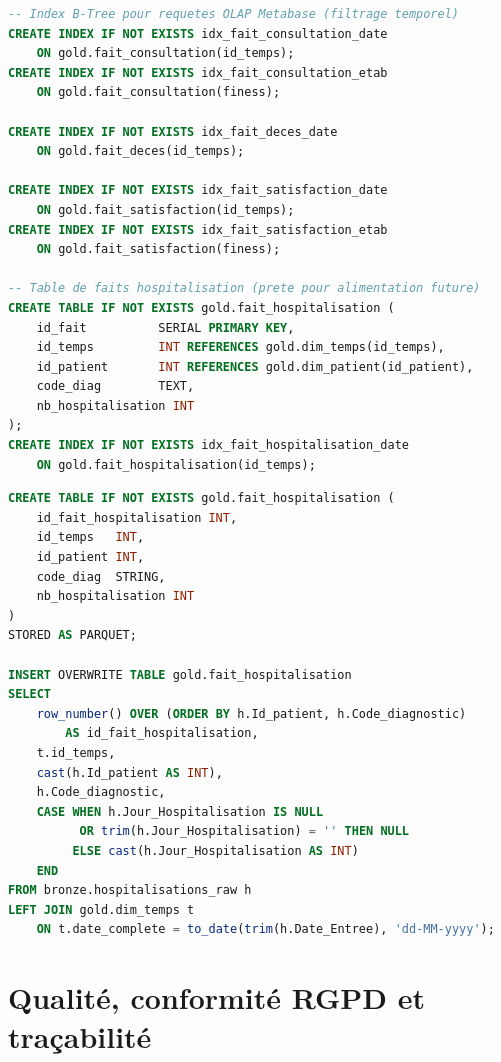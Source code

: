 \documentclass[12pt,a4paper]{report}
\begin{document}
\begin{lstlisting}[language=SQL, caption=003\_create\_gold\_core.sql -- index B-Tree sur les tables de faits]
-- Index B-Tree pour requetes OLAP Metabase (filtrage temporel)
CREATE INDEX IF NOT EXISTS idx_fait_consultation_date
    ON gold.fait_consultation(id_temps);
CREATE INDEX IF NOT EXISTS idx_fait_consultation_etab
    ON gold.fait_consultation(finess);

CREATE INDEX IF NOT EXISTS idx_fait_deces_date
    ON gold.fait_deces(id_temps);

CREATE INDEX IF NOT EXISTS idx_fait_satisfaction_date
    ON gold.fait_satisfaction(id_temps);
CREATE INDEX IF NOT EXISTS idx_fait_satisfaction_etab
    ON gold.fait_satisfaction(finess);

-- Table de faits hospitalisation (prete pour alimentation future)
CREATE TABLE IF NOT EXISTS gold.fait_hospitalisation (
    id_fait          SERIAL PRIMARY KEY,
    id_temps         INT REFERENCES gold.dim_temps(id_temps),
    id_patient       INT REFERENCES gold.dim_patient(id_patient),
    code_diag        TEXT,
    nb_hospitalisation INT
);
CREATE INDEX IF NOT EXISTS idx_fait_hospitalisation_date
    ON gold.fait_hospitalisation(id_temps);
\end{lstlisting}

\begin{lstlisting}[language=SQL, caption={Cible HiveQL Parquet pour fait\_hospitalisation -- perspective hive/}]
CREATE TABLE IF NOT EXISTS gold.fait_hospitalisation (
    id_fait_hospitalisation INT,
    id_temps   INT,
    id_patient INT,
    code_diag  STRING,
    nb_hospitalisation INT
)
STORED AS PARQUET;

INSERT OVERWRITE TABLE gold.fait_hospitalisation
SELECT
    row_number() OVER (ORDER BY h.Id_patient, h.Code_diagnostic)
        AS id_fait_hospitalisation,
    t.id_temps,
    cast(h.Id_patient AS INT),
    h.Code_diagnostic,
    CASE WHEN h.Jour_Hospitalisation IS NULL
          OR trim(h.Jour_Hospitalisation) = '' THEN NULL
         ELSE cast(h.Jour_Hospitalisation AS INT)
    END
FROM bronze.hospitalisations_raw h
LEFT JOIN gold.dim_temps t
    ON t.date_complete = to_date(trim(h.Date_Entree), 'dd-MM-yyyy');
\end{lstlisting}

\clearpage
\section{Qualité, conformité RGPD et traçabilité}
\end{document}
